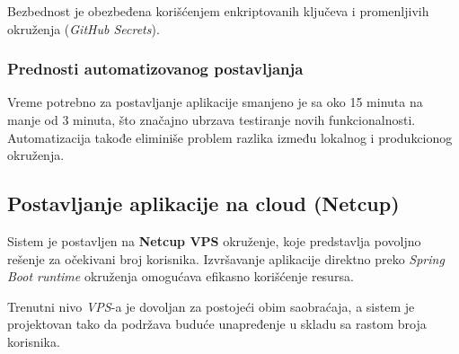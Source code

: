 \documentclass[12pt]{article}
\begin{document}
    Bezbednost je obezbeđena korišćenjem enkriptovanih ključeva i promenljivih okruženja (\textit{GitHub Secrets}).

    \subsubsection*{Prednosti automatizovanog postavljanja}

    Vreme potrebno za postavljanje aplikacije smanjeno je sa oko 15 minuta na manje od 3 minuta, 
    što značajno ubrzava testiranje novih funkcionalnosti. Automatizacija takođe eliminiše problem 
    razlika između lokalnog i produkcionog okruženja.

    \newpage

    \subsection{Postavljanje aplikacije na cloud (Netcup)}

    Sistem je postavljen na \textbf{Netcup VPS} okruženje, koje predstavlja povoljno rešenje za 
    očekivani broj korisnika. Izvršavanje aplikacije direktno 
    preko \textit{Spring Boot runtime} okruženja omogućava efikasno korišćenje resursa.

    Trenutni nivo \textit{VPS}-a je dovoljan za postojeći obim saobraćaja, 
    a sistem je projektovan tako da podržava buduće unapređenje u skladu sa rastom broja korisnika.



\newpage
\printbibliography[title={Literatura}]
\end{document}
